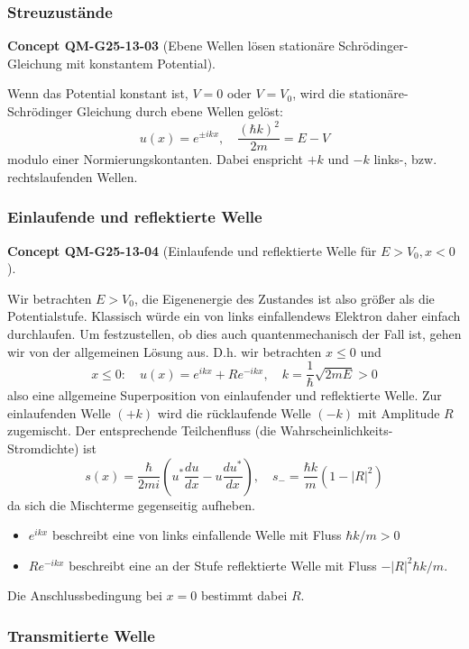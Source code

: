 \documentclass[10pt, letterpaper]{article}
\newcommand{\CustomHeading}[3]{%
  \par\medskip\noindent%
  \textbf{#1 #2} \textnormal{(#3)}.\enskip%
}
\newenvironment{CONC}[2]{\begin{unitbox}\CustomHeading{Concept}{#1}{#2}}{\end{unitbox}}
\begin{document}
\subsubsection{Streuzustände}


\begin{CONC}{QM-G25-13-03}{Ebene Wellen lösen stationäre Schrödinger-Gleichung mit konstantem Potential}
Wenn das Potential konstant ist, $V=0$ oder $V=V_{0}$, wird die stationäre-Schrödinger Gleichung durch ebene Wellen gelöst:
$$
u(x)=e^{ \pm i k x}, \quad \frac{(\hbar k)^{2}}{2 m}=E-V
$$
modulo einer Normierungskontanten. Dabei enspricht $+k$ und $-k$ links-, bzw. rechtslaufenden Wellen.
\end{CONC}


\subsubsection*{Einlaufende und reflektierte Welle}


\begin{CONC}{QM-G25-13-04}{Einlaufende und reflektierte Welle für $E>V_0, x<0$}
Wir betrachten $E>V_{0}$, die Eigenenergie des Zustandes ist also größer als die Potentialstufe. Klassisch würde ein von links einfallendews Elektron daher einfach durchlaufen. Um festzustellen, ob dies auch quantenmechanisch der Fall ist, gehen wir von der allgemeinen Lösung aus. D.h. wir betrachten $x \leq 0$ und
$$
x \leq 0: \quad u(x)=e^{i k x}+R e^{-i k x}, \quad k=\frac{1}{\hbar} \sqrt{2 m E}>0
$$
also eine allgemeine Superposition von einlaufender und reflektierte Welle. Zur einlaufenden Welle $(+k)$ wird die rücklaufende Welle $(-k)$ mit Amplitude $R$ zugemischt. Der entsprechende Teilchenfluss (die Wahrscheinlichkeits-Stromdichte) ist
$$
s(x)=\frac{\hbar}{2 m i}\left(u^{*} \frac{d u}{d x}-u \frac{d u^{*}}{d x}\right), \quad s_{-}=\frac{\hbar k}{m}\left(1-|R|^{2}\right)
$$
da sich die Mischterme gegenseitig aufheben.
\begin{itemize}
  \item $e^{i k x}$ beschreibt eine von links einfallende Welle mit Fluss $\hbar k / m>0$
  \item $R e^{-i k x}$ beschreibt eine an der Stufe reflektierte Welle mit Fluss $-|R|^{2} \hbar k / m$.
\end{itemize}
Die Anschlussbedingung bei $x=0$ bestimmt dabei $R$.
\end{CONC}



\subsubsection*{Transmitierte Welle}
\end{document}
